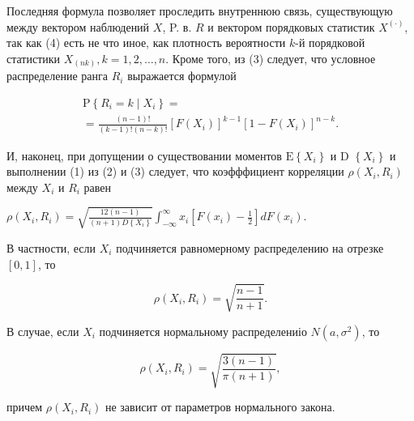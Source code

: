 \documentclass[10pt]{article}
\begin{document}
Последняя формула позволяет проследить внутреннюю связь, существующую между вектором наблюдений $X$, P. в. $R$ и вектором порядковых статистик $X^{(\cdot)}$, так как (4) есть не что иное, как плотность вероятности $k$-й порядковой статистики $X_{(n k)}, k=1,2, \ldots, n$. Кроме того, из (3) следует, что условное распределение ранга $R_{i}$ выражается формулой



\[

\begin{gathered}

\mathrm{P}\left\{R_{i}=k \mid X_{i}\right\}= \\

=\frac{(n-1) !}{(k-1) !(n-k) !}\left[F\left(X_{i}\right)\right]^{k-1}\left[1-F\left(X_{i}\right)\right]^{n-k} .

\end{gathered}

\]



И, наконец, при допущении о существовании моментов $\mathrm{E}\left\{X_{i}\right\}$ и D $\left\{X_{i}\right\}$ и выполнении (1) из (2) и (3) следует, что коэфффициент корреляции $\rho\left(X_{i}, R_{i}\right)$ между $X_{i}$ и $R_{i}$ равен



$\rho\left(X_{i}, R_{i}\right)=\sqrt{\frac{12(n-1)}{(n+1) D\left\{X_{i}\right\}}} \int_{-\infty}^{\infty} x_{i}\left[F\left(x_{i}\right)-\frac{1}{2}\right] d F\left(x_{i}\right)$.



В частности, если $X_{i}$ подчиняется равномерному распределению на отрезке $[0,1]$, то



\[

\rho\left(X_{i}, R_{i}\right)=\sqrt{\frac{n-1}{n+1}} .

\]



В случае, если $X_{i}$ подчиняется нормальному распределениіо $N\left(a, \sigma^{2}\right)$, то



\[

\rho\left(X_{i}, R_{i}\right)=\sqrt{\frac{3(n-1)}{\pi(n+1)}},

\]



причем $\rho\left(X_{i}, R_{i}\right)$ не зависит от параметров нормального закона.
\end{document}
